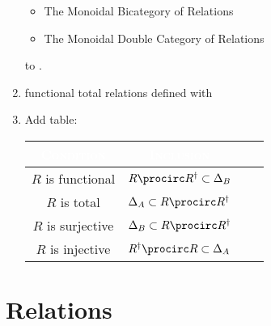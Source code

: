 \begin{enumerate}
        \begin{itemize}
            \item The Monoidal Bicategory of Relations
            \item The Monoidal Double Category of Relations
        \end{itemize}
        to \ChapterRelations.
    \item functional total relations defined with 
    \item Add table:
        \begingroup%
        \setlength\cellspacetoplimit{3pt}
        \setlength\cellspacebottomlimit{3pt}
        \renewcommand{\arraystretch}{1.2}
        \begin{center}
            \begin{tabular}{|Sc|Sc|}\\\hline{}
                \textcolor{white}{\textbf{\textsc{Condition}}} & \textcolor{white}{\textbf{\textsc{Inclusion}}}       \\\hline{}
                $R$ is functional                              & $R\procirc R^{\dagger}\subset \Delta_{B}$            \\
                $R$ is total                                   & $\Delta_{A}           \subset R\procirc R^{\dagger}$ \\
                $R$ is surjective                              & $\Delta_{B}           \subset R\procirc R^{\dagger}$ \\
                $R$ is injective                               & $R^{\dagger}\procirc R\subset \Delta_{A}$            \\\hline
            \end{tabular}
        \end{center}
        \endgroup
\end{enumerate}

\ChapterTableOfContents

\section{Relations}\label{section-relations}
